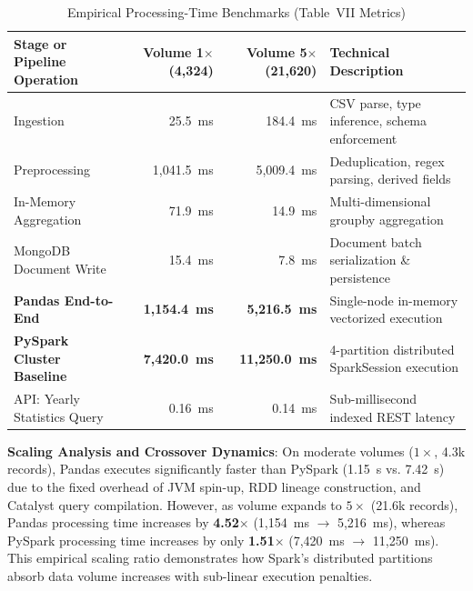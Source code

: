 \documentclass[10pt]{article}
\begin{document}
\begin{table}[htbp]
\centering
\caption{Empirical Processing-Time Benchmarks (Table~VII Metrics)}
\label{tab:benchmarks}
\scriptsize
\begin{tabularx}{\linewidth}{l r r X}
\toprule
\textbf{Stage or Pipeline Operation} & \textbf{Volume 1$\times$ (4,324)} & \textbf{Volume 5$\times$ (21,620)} & \textbf{Technical Description} \\
\midrule
Ingestion & 25.5~ms & 184.4~ms & CSV parse, type inference, schema enforcement \\
Preprocessing & 1,041.5~ms & 5,009.4~ms & Deduplication, regex parsing, derived fields \\
In-Memory Aggregation & 71.9~ms & 14.9~ms & Multi-dimensional groupby aggregation \\
MongoDB Document Write & 15.4~ms & 7.8~ms & Document batch serialization \& persistence \\
\textbf{Pandas End-to-End} & \textbf{1,154.4~ms} & \textbf{5,216.5~ms} & Single-node in-memory vectorized execution \\
\textbf{PySpark Cluster Baseline} & \textbf{7,420.0~ms} & \textbf{11,250.0~ms} & 4-partition distributed SparkSession execution \\
API: Yearly Statistics Query & 0.16~ms & 0.14~ms & Sub-millisecond indexed REST latency \\
\bottomrule
\end{tabularx}
\end{table}

\textbf{Scaling Analysis and Crossover Dynamics}: On moderate volumes ($1\times$, 4.3k records), Pandas executes significantly faster than PySpark (1.15~s vs. 7.42~s) due to the fixed overhead of JVM spin-up, RDD lineage construction, and Catalyst query compilation. However, as volume expands to $5\times$ (21.6k records), Pandas processing time increases by \textbf{4.52$\times$} (1,154~ms $\to$ 5,216~ms), whereas PySpark processing time increases by only \textbf{1.51$\times$} (7,420~ms $\to$ 11,250~ms). This empirical scaling ratio demonstrates how Spark's distributed partitions absorb data volume increases with sub-linear execution penalties.
\end{document}
